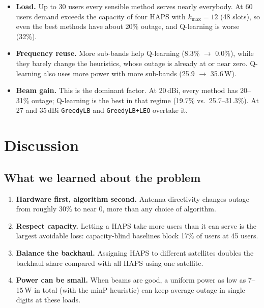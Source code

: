 \documentclass[11pt,a4paper]{article}
\begin{document}
\begin{itemize}
  \item \textbf{Load.} Up to 30 users every sensible method serves nearly everybody. At 60 users demand exceeds the capacity of four HAPS with $k_{\max}=12$ (48 slots), so even the best methods have about 20\% outage, and Q-learning is worse (32\%).
  \item \textbf{Frequency reuse.} More sub-bands help Q-learning (8.3\% $\rightarrow$ 0.0\%), while they barely change the heuristics, whose outage is already at or near zero. Q-learning also uses more power with more sub-bands (25.9 $\rightarrow$ 35.6\,W).
  \item \textbf{Beam gain.} This is the dominant factor. At 20\,dBi, every method has 20--31\% outage; Q-learning is the best in that regime (19.7\% vs.\ 25.7--31.3\%). At 27 and 35\,dBi \texttt{GreedyLB} and \texttt{GreedyLB+LEO} overtake it.
\end{itemize}

\section{Discussion}
\label{sec:discussion}

\subsection{What we learned about the problem}
\begin{enumerate}
  \item \textbf{Hardware first, algorithm second.} Antenna directivity changes outage from roughly 30\% to near 0, more than any choice of algorithm.
  \item \textbf{Respect capacity.} Letting a HAPS take more users than it can serve is the largest avoidable loss: capacity-blind baselines block 17\% of users at 45 users.
  \item \textbf{Balance the backhaul.} Assigning HAPS to different satellites doubles the backhaul share compared with all HAPS using one satellite.
  \item \textbf{Power can be small.} When beams are good, a uniform power as low as 7--15\,W in total (with the minP heuristic) can keep average outage in single digits at these loads.
\end{enumerate}
\end{document}

